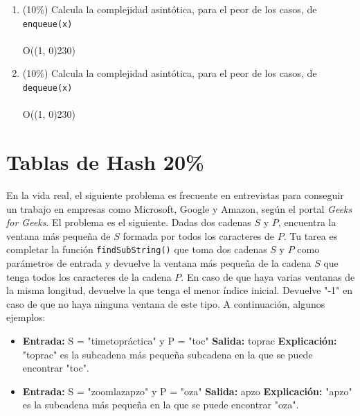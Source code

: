 \documentclass[10 pt]{article}
\begin{document}
\begin{enumerate}[label=(\Alph*)]

  \item (10\%) Calcula la complejidad asintótica, para el peor de los casos, de 
   \texttt{enqueue(x)} \\ \\
   O(\line(1, 0){230})\\

  \item (10\%) Calcula la complejidad asintótica, para el peor de los casos, de 
   \texttt{dequeue(x)} \\ \\
   O(\line(1, 0){230})\\


\end{enumerate}

\newpage



\section{Tablas de Hash 20\%}
En la vida real, el siguiente problema es frecuente en entrevistas para conseguir un trabajo en empresas como Microsoft, Google y Amazon, según
el portal \textit{Geeks for Geeks}. El problema es el siguiente. Dadas dos cadenas $S$ y $P$, encuentra la ventana más pequeña de $S$ formada por todos los caracteres de $P$. Tu tarea es completar la función \texttt{findSubString()} que toma dos cadenas $S$ y $P$ como parámetros de entrada y devuelve la ventana más pequeña de la cadena $S$ que tenga todos los caracteres de la cadena $P$. En caso de que haya varias ventanas de la misma longitud, devuelve la que tenga el menor índice inicial. Devuelve "-1" en caso de que no haya ninguna ventana de este tipo. A continuación, algunos ejemplos:

\begin{itemize}
  \item
\noindent
\textbf{Entrada:} S = "timetopráctica" y P = "toc"
\noindent
\textbf{Salida:} toprac
\noindent
\textbf{Explicación:} "toprac" es la subcadena más pequeña
subcadena en la que se puede encontrar "toc".
\item 
\noindent
\textbf{Entrada:} S = "zoomlazapzo" y P = "oza"
\noindent
\textbf{Salida:}  apzo
\noindent
\textbf{Explicación:} "apzo" es la subcadena más pequeña 
en la que se puede encontrar "oza".
\end{itemize}
\end{document}
